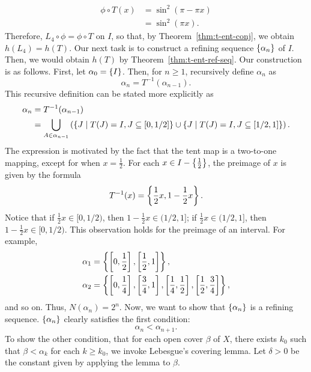 \documentclass[12pt,twoside,draft]{book}
\begin{document}
\begin{align*}
  \phi \circ T(x)
  &= \sin^2(\pi - \pi x) \\
  &= \sin^2(\pi x).
\end{align*}
Therefore, $L_4 \circ \phi = \phi \circ T$ on $I$, so that, by Theorem~\ref{thm:t-ent-conj}, we obtain $h(L_4) = h(T)$.
Our next task is to construct a refining sequence $\left \{ \alpha_n \right \}$ of $I$.
Then, we would obtain $h(T)$ by Theorem~\ref{thm:t-ent-ref-seq}.
Our construction is as follows.
First, let $\alpha_0 = \left \{ I \right \}$.
Then, for $n \geq 1$, recursively define $\alpha_n$ as
\begin{equation*}
  \alpha_n = T^{-1}(\alpha_{n-1}).
\end{equation*}
%
This recursive definition can be stated more explicitly as
\begin{align*}
  \alpha_n &= T^{-1}(\alpha_{n-1}) \\
  &= \bigcup\limits_{A \in \alpha_{n-1}} \left (  \left \{ J \mathrel{} \middle| \mathrel{} T(J) = I, J \subseteq [0,1/2] \right \} \cup \left \{ J \mathrel{} \middle| \mathrel{} T(J) = I, J \subseteq [1/2,1] \right \} \right ).
\end{align*}
The expression is motivated by the fact that the tent map is a two-to-one mapping, except for when $x = \frac{1}{2}$.
For each $x \in I - \left \{ \frac{1}{2} \right \}$, the preimage of $x$ is given by the formula
\begin{equation*}
  T^{-1}(x) = \left \{ \frac{1}{2} x, 1 - \frac{1}{2} x \right \}.
\end{equation*}
Notice that if $\frac{1}{2} x \in [0,1/2)$, then $1 - \frac{1}{2} x \in (1/2,1]$; if $\frac{1}{2} x \in (1/2,1]$, then $1 - \frac{1}{2} x \in [0,1/2)$.
This observation holds for the preimage of an interval.
For example,
\begin{align*}
  \alpha_1 &= \left \{ \left [ 0,\frac{1}{2} \right ], \left [ \frac{1}{2}, 1 \right ] \right \}, \\
  \alpha_2 &= \left \{ \left [ 0,\frac{1}{4} \right ], \left [ \frac{3}{4}, 1 \right ], \left [ \frac{1}{4}, \frac{1}{2} \right ], \left [ \frac{1}{2}, \frac{3}{4} \right ] \right \},
\end{align*}
and so on.
Thus, $N(\alpha_{n}) = 2^n$.
Now, we want to show that $\left \{ \alpha_n \right \}$ is a refining sequence.
$\left \{ \alpha_n \right \}$ clearly satisfies the first condition:
\begin{equation*}
  \alpha_n < \alpha_{n+1}.
\end{equation*}
To show the other condition, that for each open cover $\beta$ of $X$, there exists $k_0$ such that $\beta < \alpha_k$ for each $k \geq k_0$, we invoke Lebesgue's covering lemma.
Let $\delta > 0$ be the constant given by applying the lemma to $\beta$.
\end{document}

